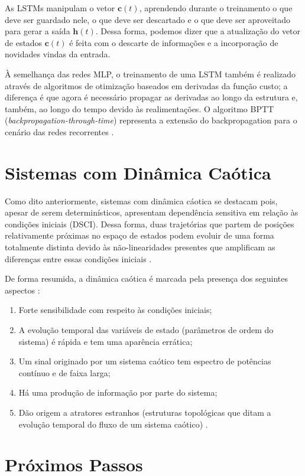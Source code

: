 \documentclass[a4paper, 12pt]{article}
\begin{document}
As LSTMs manipulam o vetor $\mathbf{c}(t)$, aprendendo durante o treinamento o que deve ser guardado nele, o que deve ser descartado e o que deve ser aproveitado para gerar a saída $\mathbf{h}(t)$. Dessa forma, podemos dizer que a atualização do vetor de estados $\mathbf{c}(t)$ é feita com o descarte de informações e a incorporação de novidades vindas da entrada. 

À semelhança das redes MLP, o treinamento de uma LSTM também é realizado através de algoritmos de otimização baseados em derivadas da função custo; a diferença é que agora é necessário propagar as derivadas ao longo da estrutura e, também, ao longo do tempo devido às realimentações. O algoritmo BPTT (\textit{backpropagation-through-time}) representa a extensão do backpropagation para o cenário das redes recorrentes \cite{geron2019hands}. 

\section{Sistemas com Dinâmica Caótica}
Como dito anteriormente, sistemas com dinâmica cáotica se destacam pois, apesar de serem determinísticos, apresentam dependência sensitiva em relação às condições iniciais (DSCI). Dessa forma, duas trajetórias que partem de posições relativamente próximas no espaço de estados podem evoluir de uma forma totalmente distinta devido às não-linearidades presentes que amplificam as diferenças entre essas condições iniciais \cite{fiedler1994caos}.

De forma resumida, a dinâmica caótica é marcada pela presença dos seguintes aspectos \cite{attux2001dinamica}:
\begin{enumerate}
\item Forte sensibilidade com respeito às condições iniciais;
\item A evolução temporal das variáveis de estado (parâmetros de ordem do sistema) é rápida e tem uma aparência errática;
\item Um sinal originado por um sistema caótico tem espectro de potências contínuo e de faixa larga;
\item Há uma produção de informação por parte do sistema;
\item Dão origem a atratores estranhos (estruturas topológicas que ditam a evolução temporal do fluxo de um sistema caótico) \cite{ruelle1971nature}.
\end{enumerate}

\section{Próximos Passos}
\end{document}
